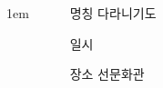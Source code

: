 \documentclass[	20pt, 
							a1paper, 
							portrait, %
							margin=0mm, %
							innermargin=10mm,  		%
							colspace=5mm, 
							subcolspace=0mm
							]{tikzposter}
\begin{document}
\begin{columns}
{\begin{LARGE}
\begin{itemize}
					\end{itemize}
				\end{LARGE}
			}



			{
					\setlength{\leftmargini}{4em}
					\setlength{\labelsep} {1em}
				\begin{LARGE}
					\begin{itemize}
					\item [명칭] 다라니기도
					\item [일시] 
					\item [장소] 선문화관
					\end{itemize}
				\end{LARGE}
			}




	\end{columns}
\end{document}
